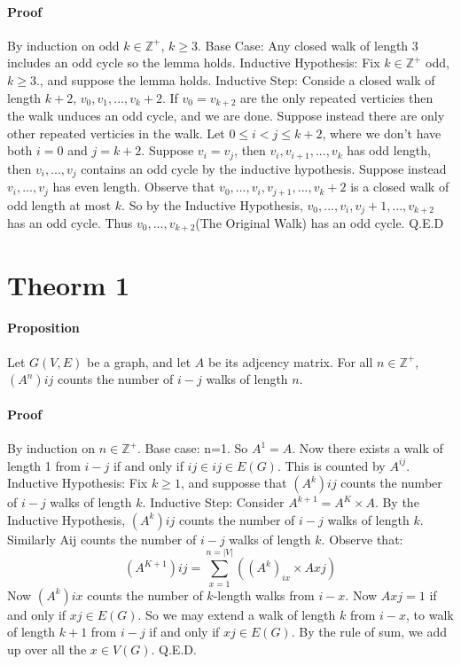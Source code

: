 \documentclass{article}
\begin{document}
\paragraph{Proof}By induction on odd $k\in \mathbb{Z}^+$, $k \geq 3$. Base Case: Any closed walk of length 3 includes an odd cycle so the lemma holds. Inductive Hypothesis: Fix $k\in \mathbb{Z}^+$ odd, $k\geq 3$., and suppose the lemma holds. Inductive Step: Conside a closed walk of length $k+2$, $v_0,v_1,...,v_k+2$. If $v_0 = v_{k+2}$ are the only repeated verticies then the walk unduces an odd cycle, and we are done. Suppose instead there are only other repeated verticies in the walk. Let $0 \leq i < j \leq k+2$, where we don't have both $i=0$ and $j=k+2$. Suppose $v_i = v_j$, then $v_i,v_{i+1},...,v_k$ has odd length, then $v_i,...,v_j$ contains an odd cycle by the inductive hypothesis. Suppose instead $v_i,...,v_j$ has even length. Observe that $v_0,...,v_i,v_{j+1},...,v_k+2$ is a closed walk of odd length at most $k$. So by the Inductive Hypothesis, $v_0,...,v_i,v_j+1,...,v_{k+2}$ has an odd cycle. Thus $v_0,...,v_{k+2}$(The Original Walk) has an odd cycle. Q.E.D

\section{Theorm 1}
\paragraph{Proposition} Let $G(V,E)$ be a graph, and let $A$ be its adjcency matrix. For all $n \in \mathbb{Z}^+$, $(A^n)ij$ counts the number of $i-j$ walks of length $n$.
\paragraph{Proof} By induction on $n \in \mathbb{Z}^+$. Base case: n=1. So $A^1 = A$. Now there exists a walk of length 1 from $i-j$ if and only if $ij \in ij \in E(G)$. This is counted by $A^{ij}$. Inductive Hypothesis: Fix $k \geq 1$, and supposse that $(A^k)ij$ counts the number of $i-j$ walks of length $k$. Inductive Step: Consider $A^{k+1}= A^K\times A$. By the Inductive Hypothesis, $(A^k)ij$ counts the number of $i-j$ walks of length $k$. Similarly Aij counts the number of $i-j$ walks of length $k$. Observe that: $$(A^{K+1})ij = \sum_{x=1}^{n= |V|}((A^k)_{ix}\times Axj)$$ Now $(A^k)ix$ counts the number of $k$-length walks from $i-x$. Now $Axj=1$ if and only if $xj\in E(G)$. So we may extend a walk of length $k$ from $i-x$, to walk of length $k+1$ from $i-j$ if and only if $xj \in E(G)$. By the rule of sum, we add up over all the $x \in V(G)$. Q.E.D.
 
\end{document}

